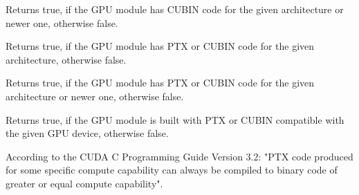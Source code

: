 Returns true, if the GPU module has CUBIN code for the given architecture or newer one, otherwise false.

\begin{description}
\end{description}


Returns true, if the GPU module has PTX or CUBIN code for the given architecture, otherwise false.

\begin{description}
\end{description}


Returns true, if the GPU module has PTX or CUBIN code for the given architecture or newer one, otherwise false.

\begin{description}
\end{description}


Returns true, if the GPU module is built with PTX or CUBIN compatible with the given GPU device, otherwise false.

\begin{description}
\end{description}


According to the CUDA C Programming Guide Version 3.2: "PTX code produced for some specific compute capability can always be compiled to binary code of greater or equal compute capability". 


